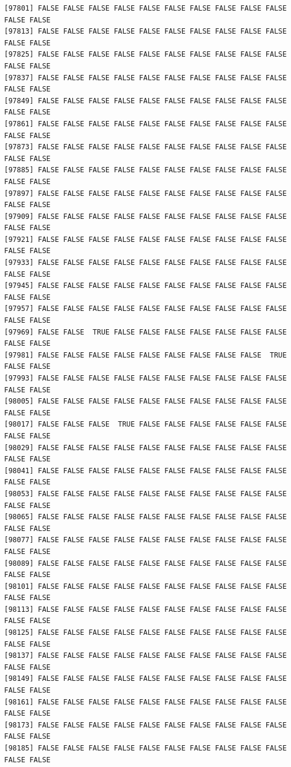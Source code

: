 \documentclass[
  a4paper,
  DIV=11,
  numbers=noendperiod]{scrartcl}
\begin{document}
\begin{verbatim}
[97801] FALSE FALSE FALSE FALSE FALSE FALSE FALSE FALSE FALSE FALSE FALSE FALSE
[97813] FALSE FALSE FALSE FALSE FALSE FALSE FALSE FALSE FALSE FALSE FALSE FALSE
[97825] FALSE FALSE FALSE FALSE FALSE FALSE FALSE FALSE FALSE FALSE FALSE FALSE
[97837] FALSE FALSE FALSE FALSE FALSE FALSE FALSE FALSE FALSE FALSE FALSE FALSE
[97849] FALSE FALSE FALSE FALSE FALSE FALSE FALSE FALSE FALSE FALSE FALSE FALSE
[97861] FALSE FALSE FALSE FALSE FALSE FALSE FALSE FALSE FALSE FALSE FALSE FALSE
[97873] FALSE FALSE FALSE FALSE FALSE FALSE FALSE FALSE FALSE FALSE FALSE FALSE
[97885] FALSE FALSE FALSE FALSE FALSE FALSE FALSE FALSE FALSE FALSE FALSE FALSE
[97897] FALSE FALSE FALSE FALSE FALSE FALSE FALSE FALSE FALSE FALSE FALSE FALSE
[97909] FALSE FALSE FALSE FALSE FALSE FALSE FALSE FALSE FALSE FALSE FALSE FALSE
[97921] FALSE FALSE FALSE FALSE FALSE FALSE FALSE FALSE FALSE FALSE FALSE FALSE
[97933] FALSE FALSE FALSE FALSE FALSE FALSE FALSE FALSE FALSE FALSE FALSE FALSE
[97945] FALSE FALSE FALSE FALSE FALSE FALSE FALSE FALSE FALSE FALSE FALSE FALSE
[97957] FALSE FALSE FALSE FALSE FALSE FALSE FALSE FALSE FALSE FALSE FALSE FALSE
[97969] FALSE FALSE  TRUE FALSE FALSE FALSE FALSE FALSE FALSE FALSE FALSE FALSE
[97981] FALSE FALSE FALSE FALSE FALSE FALSE FALSE FALSE FALSE  TRUE FALSE FALSE
[97993] FALSE FALSE FALSE FALSE FALSE FALSE FALSE FALSE FALSE FALSE FALSE FALSE
[98005] FALSE FALSE FALSE FALSE FALSE FALSE FALSE FALSE FALSE FALSE FALSE FALSE
[98017] FALSE FALSE FALSE  TRUE FALSE FALSE FALSE FALSE FALSE FALSE FALSE FALSE
[98029] FALSE FALSE FALSE FALSE FALSE FALSE FALSE FALSE FALSE FALSE FALSE FALSE
[98041] FALSE FALSE FALSE FALSE FALSE FALSE FALSE FALSE FALSE FALSE FALSE FALSE
[98053] FALSE FALSE FALSE FALSE FALSE FALSE FALSE FALSE FALSE FALSE FALSE FALSE
[98065] FALSE FALSE FALSE FALSE FALSE FALSE FALSE FALSE FALSE FALSE FALSE FALSE
[98077] FALSE FALSE FALSE FALSE FALSE FALSE FALSE FALSE FALSE FALSE FALSE FALSE
[98089] FALSE FALSE FALSE FALSE FALSE FALSE FALSE FALSE FALSE FALSE FALSE FALSE
[98101] FALSE FALSE FALSE FALSE FALSE FALSE FALSE FALSE FALSE FALSE FALSE FALSE
[98113] FALSE FALSE FALSE FALSE FALSE FALSE FALSE FALSE FALSE FALSE FALSE FALSE
[98125] FALSE FALSE FALSE FALSE FALSE FALSE FALSE FALSE FALSE FALSE FALSE FALSE
[98137] FALSE FALSE FALSE FALSE FALSE FALSE FALSE FALSE FALSE FALSE FALSE FALSE
[98149] FALSE FALSE FALSE FALSE FALSE FALSE FALSE FALSE FALSE FALSE FALSE FALSE
[98161] FALSE FALSE FALSE FALSE FALSE FALSE FALSE FALSE FALSE FALSE FALSE FALSE
[98173] FALSE FALSE FALSE FALSE FALSE FALSE FALSE FALSE FALSE FALSE FALSE FALSE
[98185] FALSE FALSE FALSE FALSE FALSE FALSE FALSE FALSE FALSE FALSE FALSE FALSE

\end{verbatim}
\end{document}
